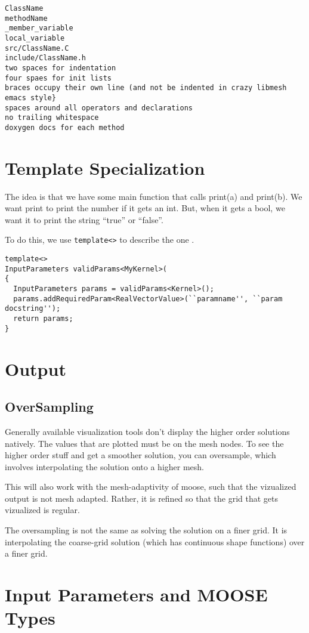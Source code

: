 \begin{verbatim}
ClassName
methodName
_member_variable
local_variable
src/ClassName.C
include/ClassName.h
two spaces for indentation
four spaes for init lists
braces occupy their own line (and not be indented in crazy libmesh emacs style}
spaces around all operators and declarations
no trailing whitespace
doxygen docs for each method
\end{verbatim}


\section{Template Specialization}

The idea is that we have some main function that calls print(a) and print(b). We 
want print to print the number if it gets an int. But, when it gets a bool, we 
want it to print the string ``true'' or ``false''.

To do this, we use \verb|template<>| to describe the one .

\begin{verbatim}
template<> 
InputParameters validParams<MyKernel>(
{
  InputParameters params = validParams<Kernel>();
  params.addRequiredParam<RealVectorValue>(``paramname'', ``param docstring'');
  return params;
}
\end{verbatim}


\section{Output}

\subsection{OverSampling}
Generally available visualization tools don't display the higher order solutions 
natively. The values that are plotted must be on the mesh nodes. To see the 
higher order stuff and get a smoother solution, you can oversample, which 
involves interpolating the solution onto a higher mesh. 

This will also work with the mesh-adaptivity of moose, such that the vizualized 
output is not mesh adapted. Rather, it is refined so that the grid that gets 
vizualized is regular. 

The oversampling is not the same as solving the solution on a finer grid. It is 
interpolating the coarse-grid solution (which has continuous shape functions) 
over a finer grid.

\section{Input Parameters and MOOSE Types}

